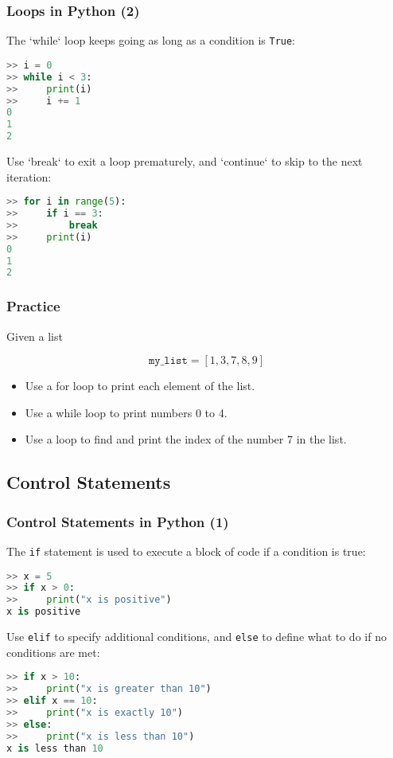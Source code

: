 \begin{frame}[fragile]
  \frametitle{Loops in Python (2)}
  The `while` loop keeps going as long as a condition is \lstinline{True}:
  \begin{lstlisting}[language=Python,numbers=none]
>> i = 0
>> while i < 3:
>>     print(i)
>>     i += 1
0
1
2
  \end{lstlisting}\pause
  Use `break` to exit a loop prematurely, and `continue` to skip to the next iteration:
  \begin{lstlisting}[language=Python,numbers=none]
>> for i in range(5):
>>     if i == 3:
>>         break
>>     print(i)
0
1
2
  \end{lstlisting}
\end{frame}

\begin{frame}[fragile]
 \frametitle{Practice}
 Given a list
 
 \[
  \texttt{my\_list} = [1, 3, 7, 8, 9] 
 \]

 \begin{itemize}
  \item Use a for loop to print each element of the list.\pause
  \item Use a while loop to print numbers 0 to 4.\pause
  \item Use a loop to find and print the index of the number 7 in the list.
 \end{itemize}
\end{frame}

\subsection*{Control Statements}
\begin{frame}[fragile]
  \frametitle{Control Statements in Python (1)}
  The \lstinline{if} statement is used to execute a block of code if a condition is true:
  \begin{lstlisting}[language=Python, numbers=none]
>> x = 5
>> if x > 0:
>>     print("x is positive")
x is positive
  \end{lstlisting}\pause
  Use \lstinline{elif} to specify additional conditions, and \lstinline{else} to define what to do if no conditions are met:
  \begin{lstlisting}[language=Python, numbers=none]
>> if x > 10:
>>     print("x is greater than 10")
>> elif x == 10:
>>     print("x is exactly 10")
>> else:
>>     print("x is less than 10")
x is less than 10
  \end{lstlisting}
\end{frame}

